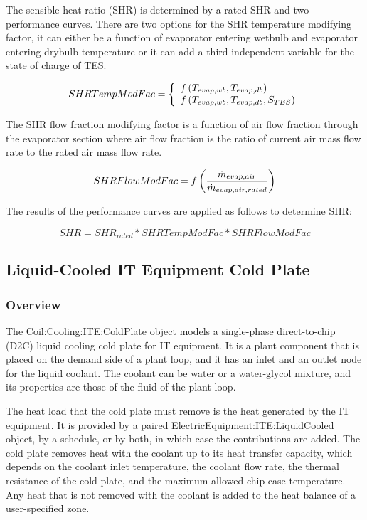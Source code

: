 The sensible heat ratio (SHR) is determined by a rated SHR and two performance curves. There are two options for the SHR temperature modifying factor, it can either be a function of evaporator entering wetbulb and evaporator entering drybulb temperature or it can add a third independent variable for the state of charge of TES.

\begin{equation}
  SHRTempModFac = \left\{
    \begin{array}{l}
      f\left(T_{evap,wb},T_{evap,db}\right) \\
      f\left(T_{evap,wb},T_{evap,db},S_{TES}\right)
    \end{array}
  \right.
\end{equation}

The SHR flow fraction modifying factor is a function of air flow fraction through the evaporator section where air flow fraction is the ratio of current air mass flow rate to the rated air mass flow rate.

\begin{equation}
SHRFlowModFac = f\left(\frac{\dot{m}_{evap,air}}{\dot{m}_{evap,air,rated}}\right)
\end{equation}

The results of the performance curves are applied as follows to determine SHR:

\begin{equation}
SHR = SH{R_{rated}}*SHRTempModFac*SHRFlowModFac
\end{equation}

\subsection{Liquid-Cooled IT Equipment Cold Plate}\label{liquid-cooled-it-equipment-cold-plate}

\subsubsection{Overview}\label{overview-coilcoolingitecoldplate}

The Coil:Cooling:ITE:ColdPlate object models a single-phase direct-to-chip (D2C) liquid cooling cold plate for IT equipment. It is a plant component that is placed on the demand side of a plant loop, and it has an inlet and an outlet node for the liquid coolant. The coolant can be water or a water-glycol mixture, and its properties are those of the fluid of the plant loop.

The heat load that the cold plate must remove is the heat generated by the IT equipment. It is provided by a paired ElectricEquipment:ITE:LiquidCooled object, by a schedule, or by both, in which case the contributions are added. The cold plate removes heat with the coolant up to its heat transfer capacity, which depends on the coolant inlet temperature, the coolant flow rate, the thermal resistance of the cold plate, and the maximum allowed chip case temperature. Any heat that is not removed with the coolant is added to the heat balance of a user-specified zone.

